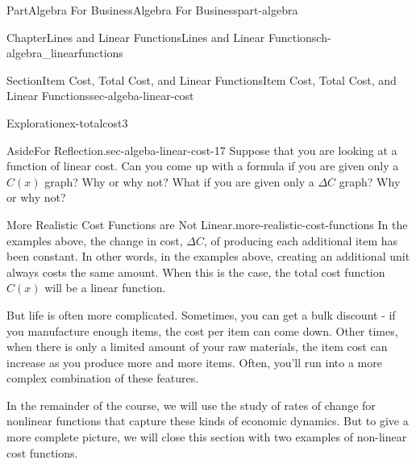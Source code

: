 \documentclass{tufte-book}
\numberwithin{equation}{chapter}
\def \tikzhistogram (#1,#2){\draw[fill=blue,opacity=0.3] ({#1+((\xtwo-\xmin)/5)},#2) rectangle ({#1-((\xtwo-\xmin)/5)},0); \draw[draw,thick] ({#1+((\xtwo-\xmin)/5)},#2) rectangle ({#1-((\xtwo-\xmin)/5)},0); \node[draw,fill=blue, circle,inner sep=2.5pt] at (#1,#2) {};}
\begin{document}
\begin{partptx}{Part}{Algebra For Business}{}{Algebra For Business}{}{}{part-algebra}
\begin{chapterptx}{Chapter}{Lines and Linear Functions}{}{Lines and Linear Functions}{}{}{ch-algebra_linearfunctions}
\begin{sectionptx}{Section}{Item Cost, Total Cost, and Linear Functions}{}{Item Cost, Total Cost, and Linear Functions}{}{}{sec-algeba-linear-cost}
\begin{exploration}{Exploration}{}{ex-totalcost3}
\begin{enumerate}[font=\bfseries,label=(\alph*),ref=\alph*]
\begin{image}{0}{1}{0}{}
{
}%
\end{image}%
\end{enumerate}%
\end{exploration}%
\begin{aside}{Aside}{For Reflection.}{sec-algeba-linear-cost-17}%
Suppose that you are looking at a function of linear cost.  Can you come up with a formula if you are given only a \(C(x)\) graph? Why or why not? What if you are given only a \(\Delta C\) graph? Why or why not?%
\end{aside}
\begin{paragraphs}{More Realistic Cost Functions are Not Linear.}{more-realistic-cost-functions}%
In the examples above, the change in cost, \(\Delta C\), of producing each additional item has been constant. In other words, in the examples above, creating an additional unit always costs the same amount. When this is the case, the total cost function \(C(x)\) will be a linear function.%
\par
But life is often more complicated. Sometimes, you can get a bulk discount - if you manufacture enough items, the cost per item can come down. Other times, when there is only a limited amount of your raw materials, the item cost can increase as you produce more and more items. Often, you'll run into a more complex combination of these features.%
\par
In the remainder of the course, we will use the study of rates of change for nonlinear functions that capture these kinds of economic dynamics. But to give a more complete picture, we will close this section with two examples of non-linear cost functions.%

\end{paragraphs}
\end{sectionptx}
\end{chapterptx}
\end{partptx}
\end{document}
